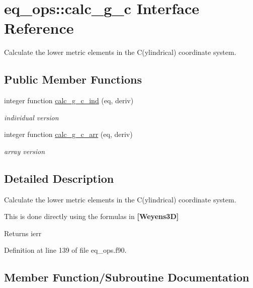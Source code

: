 \hypertarget{interfaceeq__ops_1_1calc__g__c}{}\section{eq\+\_\+ops\+:\+:calc\+\_\+g\+\_\+c Interface Reference}
\label{interfaceeq__ops_1_1calc__g__c}


Calculate the lower metric elements in the C(ylindrical) coordinate system.  


\subsection*{Public Member Functions}
\begin{DoxyCompactItemize}
\item 
integer function \hyperlink{interfaceeq__ops_1_1calc__g__c_a55dca52f3f82960703162dba425d358d}{calc\+\_\+g\+\_\+c\+\_\+ind} (eq, deriv)
\begin{DoxyCompactList}\small\item\em individual version \end{DoxyCompactList}\item 
integer function \hyperlink{interfaceeq__ops_1_1calc__g__c_a1694c8a9df96ab63255d533539020887}{calc\+\_\+g\+\_\+c\+\_\+arr} (eq, deriv)
\begin{DoxyCompactList}\small\item\em array version \end{DoxyCompactList}\end{DoxyCompactItemize}


\subsection{Detailed Description}
Calculate the lower metric elements in the C(ylindrical) coordinate system. 

This is done directly using the formula\textquotesingle{}s in {\bfseries [Weyens3D]}

\begin{DoxyReturn}{Returns}
ierr 
\end{DoxyReturn}


Definition at line 139 of file eq\+\_\+ops.\+f90.



\subsection{Member Function/\+Subroutine Documentation}
\mbox{\label{interfaceeq__ops_1_1calc__g__c_a1694c8a9df96ab63255d533539020887}} 
